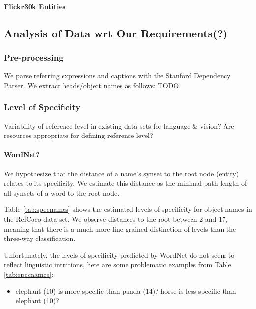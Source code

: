 \paragraph{Flickr30k Entities}

\subsection{}


\subsection{Analysis of Data wrt Our Requirements(?)}

\subsubsection{Pre-processing}
We parse referring expressions and captions with the Stanford Dependency Parser.
We extract heads/object names as follows: TODO.

\subsubsection{Level of Specificity} 
Variability of reference level in existing data sets for language \& vision?
Are resources appropriate for defining reference level?
\paragraph{WordNet?}

We hypothesize that the distance of a name's synset to the root node (entity) relates to its specificity.
We estimate this distance as the minimal path length of all synsets of a word  to the root node.

Table \ref{tab:specnames} shows the estimated levels of specificity for object names in the RefCoco data set.
We observe distances to the root between 2 and 17, meaning that there is a much more fine-grained distinction of levels than the three-way classification.

Unfortunately, the levels of specificity predicted by WordNet do not seem to reflect linguistic intuitions, here are some problematic examples from Table \ref{tab:specnames}:

\begin{itemize}
\item elephant (10) is more specific than panda (14)? horse is less specific than elephant (10)?
\end{itemize}


